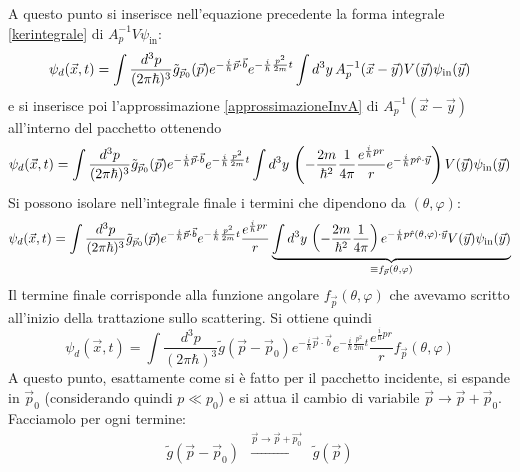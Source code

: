 \documentclass[../../FisicaTeorica.tex]{subfiles}
\begin{document}
A questo punto si inserisce nell'equazione precedente la forma integrale \eqref{kerintegrale} di $A_p^{- 1} V \psi_{\text{in}}$:
\[ \psi_d (\vec{x}, t) = \int \frac{d^3 p}{(2 \pi \hbar)^3} 
   \tilde{g}_{\vec{p}_0} (\vec{p}) e^{- \frac{i}{\hbar} \vec{p} \cdot \vec{b}}
   e^{- \frac{i}{\hbar} \frac{p^2}{2 m} t} \int d^3 y \hspace{0.17em} A_p^{-
   1} (\vec{x} - \vec{y}) V (\vec{y}) \psi_{\text{in}} (\vec{y}) \]
e si inserisce poi l'approssimazione \eqref{approssimazioneInvA} di $A_p^{- 1}  (\vec{x} - \vec{y})$
all'interno del pacchetto ottenendo
\[ \psi_d (\vec{x}, t) = \int \frac{d^3 p}{(2 \pi \hbar)^3}  \tilde{g}_{\vec{p}_0} (\vec{p}) e^{-
   \frac{i}{\hbar} \vec{p} \cdot \vec{b}} e^{- \frac{i}{\hbar} \frac{p^2}{2 m}
   t} \int d^3 y \hspace{0.17em} \left( - \frac{2 m}{\hbar^2}  \frac{1}{4 \pi}
   \frac{e^{\frac{i}{\hbar} pr}}{r} e^{- \frac{i}{\hbar} p \hat{r} \cdot
   \vec{y}} \right) V (\vec{y}) \psi_{\text{in}} (\vec{y}) \]
Si possono isolare nell'integrale finale i termini che dipendono da $(\theta,
\varphi)$:
\begin{equation}
\label{eqformaperf}
\psi_d (\vec{x}, t) = \int \frac{d^3 p}{(2 \pi \hbar)^3}  \tilde{g}_{\vec{p}_0} (\vec{p}) e^{-
   \frac{i}{\hbar} \vec{p} \cdot \vec{b}} e^{- \frac{i}{\hbar} \frac{p^2}{2 m}
   t}  \frac{e^{\frac{i}{\hbar} pr}}{r} \underbrace{\int d^3 y \hspace{0.17em}
   \left( - \frac{2 m}{\hbar^2}  \frac{1}{4 \pi} \right) e^{- \frac{i}{\hbar}
   p \hat{r} (\theta, \varphi) \cdot \vec{y}} V (\vec{y}) \psi_{\text{in}}
   (\vec{y})}_{\equiv f_{\vec{p}} (\theta, \varphi)}
\end{equation}
Il termine finale corrisponde alla funzione angolare $f_{\vec{p}} (\theta,
\varphi)$ che avevamo scritto all'inizio della trattazione sullo scattering.
Si ottiene quindi
\begin{equation}
\label{pacchettof}
\psi_d (\vec{x}, t) = \int \frac{d^3 p}{(2 \pi \hbar)^3}  \tilde{g}
   (\vec{p} - \vec{p}_0) e^{- \frac{i}{\hbar} \vec{p} \cdot \vec{b}} e^{-
   \frac{i}{\hbar} \frac{p^2}{2 m} t}  \frac{e^{\frac{i}{\hbar} pr}}{r}
   f_{\vec{p}} (\theta, \varphi)
\end{equation}
A questo punto, esattamente come si è fatto per il pacchetto incidente, si espande in $\vec{p}_0$ (considerando quindi $p \ll p_0$) e
si attua il cambio di variabile $\vec{p} \to \vec{p} + \vec{p}_0$.
Facciamolo per ogni termine:
\begingroup
\allowdisplaybreaks
\begin{eqnarray*}
  \tilde{g} (\vec{p} - \vec{p}_0) & \xrightarrow{\vec{p} \to \vec{p} +
  \overrightarrow{p_0}} & \tilde{g} (\vec{p})
\end{eqnarray*}
\end{document}
